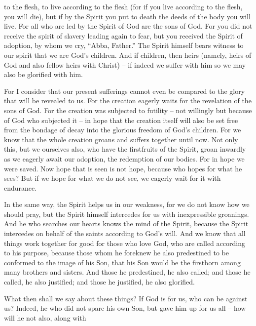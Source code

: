 {to the flesh,
to live
according to
the flesh
(for
if
you live
according to
the flesh,
you will
die), but
if
by the Spirit
you put to death
the deeds
of the body
you will live.
For
all
who are led
by the Spirit
of God
are
the sons
of God.
For
you did
not
receive
the spirit
of slavery
leading
again
to
fear,
but
you received
the Spirit
of adoption,
by
whom
we cry,
“Abba,
Father.”
The Spirit
himself
bears witness to
our
spirit
that
we are
God’s
children.
And
if
children,
then
heirs
(namely, heirs
of God
and also fellow heirs
with Christ) – if indeed we suffer with him so we may also be glorified with him.
\par }{\PP {}For
I consider
that
our present
sufferings
cannot
even be compared
to
the glory
that will
be revealed
to
us.
For
the creation
eagerly
waits for
the revelation
of the sons
of God.
For
the creation
was subjected
to futility
– not
willingly
but
because
of God who subjected it – in hope
that
the creation
itself
will
also
be set free
from
the bondage
of decay
into
the glorious
freedom
of God’s
children.
For
we know
that
the whole
creation
groans
and
suffers together
until
now.
Not
only
this, but
we
ourselves
also,
who have
the firstfruits
of the Spirit,
groan
inwardly
as we eagerly await
our adoption,
the redemption
of our
bodies.
For
in hope
we were saved.
Now hope
that is seen
is
not
hope,
because
who hopes
for what he sees?
But
if
we hope
for what
we do
not
see,
we
eagerly wait for
it with
endurance.
\par }{\PP {}In the same way,
the Spirit
helps
us in our
weakness,
for
we do
not
know
how we should
pray,
but
the Spirit
himself
intercedes
for us with inexpressible
groanings.
And
he who searches
our hearts
knows
the mind
of the Spirit,
because
the Spirit intercedes
on behalf
of the saints
according to
God’s will.
And
we know
that
all things
work together
for
good
for those who love
God,
who are
called
according
to his purpose,
because
those whom
he foreknew
he
also
predestined
to be conformed
to the image
of his
Son,
that his Son
would be
the firstborn
among
many
brothers and sisters.
And
those
he predestined,
he
also
called;
and
those he called,
he
also justified;
and
those
he justified,
he
also
glorified.
\par }{\PP {}What
then
shall we say
about
these things? If
God
is for
us,
who can be against
us?
Indeed,
he
who did
not
spare
his own
Son,
but
gave
him
up
for
us
all
– how
will he not
also,
along with
}
